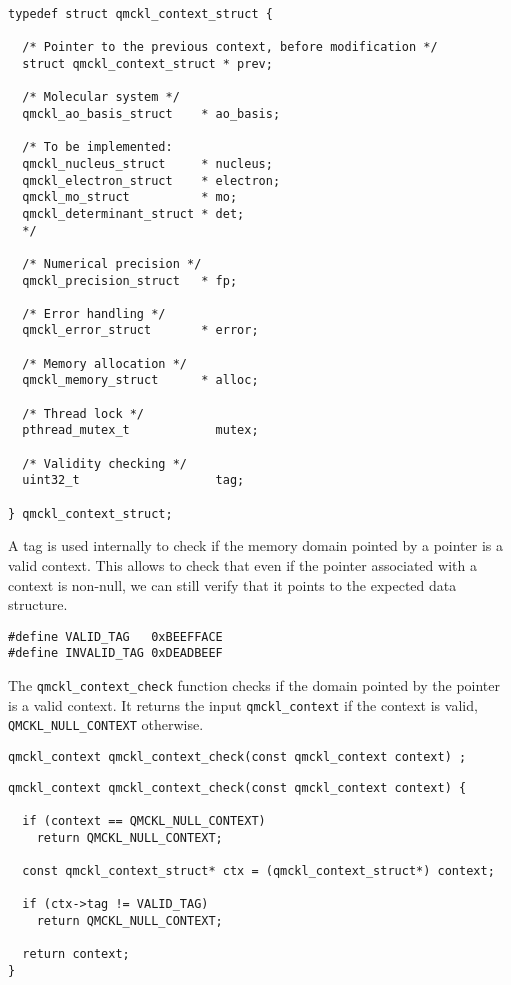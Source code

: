 \begin{verbatim}
typedef struct qmckl_context_struct {

  /* Pointer to the previous context, before modification */
  struct qmckl_context_struct * prev;

  /* Molecular system */
  qmckl_ao_basis_struct    * ao_basis;

  /* To be implemented:
  qmckl_nucleus_struct     * nucleus;
  qmckl_electron_struct    * electron;
  qmckl_mo_struct          * mo;
  qmckl_determinant_struct * det;
  */

  /* Numerical precision */
  qmckl_precision_struct   * fp;

  /* Error handling */
  qmckl_error_struct       * error;

  /* Memory allocation */
  qmckl_memory_struct      * alloc;

  /* Thread lock */
  pthread_mutex_t            mutex;

  /* Validity checking */
  uint32_t                   tag;

} qmckl_context_struct;
\end{verbatim}


A tag is used internally to check if the memory domain pointed
by a pointer is a valid context. This allows to check that even if
the pointer associated with a context is non-null, we can still
verify that it points to the expected data structure.

\begin{verbatim}
#define VALID_TAG   0xBEEFFACE
#define INVALID_TAG 0xDEADBEEF
\end{verbatim}

The \texttt{qmckl\_context\_check} function checks if the domain pointed by
the pointer is a valid context. It returns the input \texttt{qmckl\_context}
if the context is valid, \texttt{QMCKL\_NULL\_CONTEXT} otherwise.

\begin{verbatim}
qmckl_context qmckl_context_check(const qmckl_context context) ;
\end{verbatim}

\begin{verbatim}
qmckl_context qmckl_context_check(const qmckl_context context) {

  if (context == QMCKL_NULL_CONTEXT)
    return QMCKL_NULL_CONTEXT;

  const qmckl_context_struct* ctx = (qmckl_context_struct*) context;

  if (ctx->tag != VALID_TAG)
    return QMCKL_NULL_CONTEXT;

  return context;
}
\end{verbatim}

